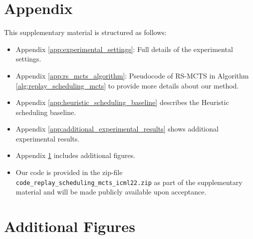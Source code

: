 

\section*{Appendix}
This supplementary material is structured as follows: 
\begin{itemize}
    \item Appendix \ref{app:experimental_settings}: Full details of the experimental settings.
    \item Appendix \ref{app:rs_mcts_algorithm}: Pseudocode of RS-MCTS in Algorithm \ref{alg:replay_scheduling_mcts} to provide more details about our method. 
    \item Appendix \ref{app:heuristic_scheduling_baseline} describes the Heuristic scheduling baseline.
    \item Appendix \ref{app:additional_experimental_results} shows additional experimental results. 
    \item Appendix \ref{app:additional_figures} includes additional figures. 
    \item Our code is provided in the zip-file {\footnotesize \texttt{code\_replay\_scheduling\_mcts\_icml22.zip}} 
    as part of the supplementary material and will be made publicly available upon acceptance. 
\end{itemize}






%
%

%

\clearpage 



\clearpage 




\clearpage

\section{Additional Figures}\label{app:additional_figures}

